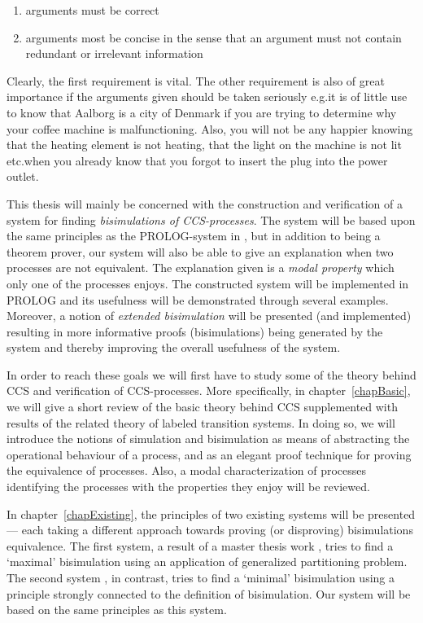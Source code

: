 \begin{enumerate}
\item arguments must be correct
\item arguments most be concise in the sense that an argument must not contain redundant or irrelevant information
\end{enumerate}

\noindent
Clearly, the first requirement is vital. The other requirement is also of great importance if the arguments given should be taken seriously e.g.\@ it is of little use to know that Aalborg is a city of Denmark if you are trying to determine why your coffee machine is malfunctioning. Also, you will not be any happier knowing that the heating element is not heating, that the light on the machine is not lit etc.\@ when you already know that you forgot to insert the plug into the power outlet.

This thesis will mainly be concerned with the construction and verification of a system for finding {\it bisimulations of CCS-processes}. The system will be based upon the same principles as the PROLOG-system in \cite{Larsen}, but in addition to being a theorem prover, our system will also be able to give an explanation when two processes are not equivalent. The explanation given is a {\it modal property\/} which only one of the processes enjoys. The constructed system will be implemented in PROLOG and its usefulness will be demonstrated through several examples. Moreover, a notion of {\it extended bisimulation\/} will be presented (and implemented) resulting in more informative proofs (bisimulations) being generated by the system and thereby improving the overall usefulness of the system.

In order to reach these goals we will first have to study some of the theory behind CCS and verification of CCS-processes. More specifically, in chapter~\ref{chapBasic}, we will give a short review of the basic theory behind CCS supplemented with results of the related theory of labeled transition systems. In doing so, we will introduce the notions of simulation and bisimulation as means of abstracting the operational behaviour of a process, and as an elegant proof technique for proving the equivalence of processes. Also, a modal characterization of processes identifying the processes with the properties they enjoy will be reviewed.

In chapter~\ref{chapExisting}, the principles of two existing systems will be presented --- each taking a different approach towards proving (or disproving) bisimulations equivalence. The first system, a result of a master thesis work \cite{VestmarOlesen}, tries to find a `maximal' bisimulation using an application of generalized partitioning problem. The second system \cite{Larsen}, in contrast, tries to find a `minimal' bisimulation using a principle strongly connected to the definition of bisimulation. Our system will be based on the same principles as this system.

